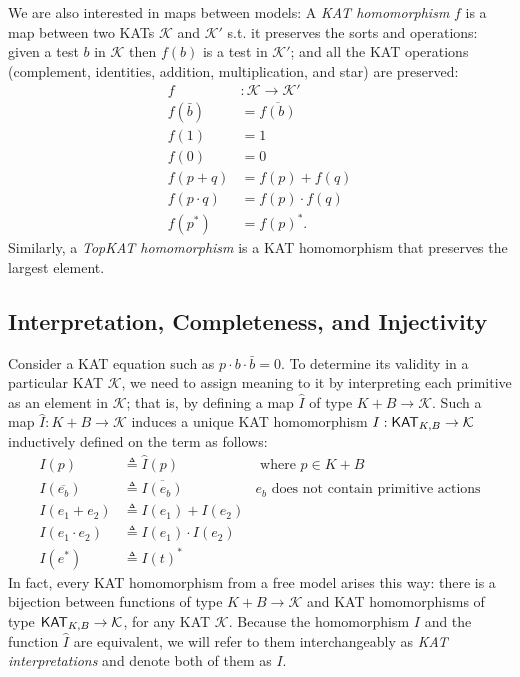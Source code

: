 We are also interested in maps between models:
A \emph{KAT homomorphism} \(f\) is a map between two KATs \(\mathcal{K}\) and \(\mathcal{K}'\)
s.t. it preserves the sorts and operations:
given a test \(b\) in \(\mathcal{K}\) then \(f(b)\) is a test in \(\mathcal{K}'\);
and all the KAT operations (complement, identities, addition, multiplication, and star) are preserved:
\begin{align*}
    f & : \mathcal{K}  \to  \mathcal{K}'\\
    f(\bar{b}) & = \overline{f(b)} \\  
    f(1) & = 1 \\  
    f(0) & = 0 \\
    f(p + q) & = f(p) + f(q) \\  
    f(p  \cdot  q) & = f(p)  \cdot  f(q) \\  
    f(p^*) & = f(p)^*.
\end{align*}
Similarly, a \emph{TopKAT homomorphism} is a KAT homomorphism that preserves the
largest element.

\subsection{Interpretation, Completeness, and Injectivity}\label{sec: completeness background}

Consider a KAT equation such as \(p  \cdot  b  \cdot  \bar{b} = 0\). To determine its
validity in a particular KAT \(\mathcal{K}\), we need to assign meaning to it by
interpreting each primitive as an element in \(\mathcal{K}\); that is, by defining a map
\(\hat{I}\) of type \(K + B  \to  \mathcal{K}\).  Such a map \(\hat{I}: K + B  \to  \mathcal{K}\) induces a
unique KAT homomorphism \(I : \mathsf{KAT}_{K,B}  \to  \mathcal{K}\) inductively defined on the term 
as follows:
\begin{equation}
    \begin{aligned}
        I(p)       &  \triangleq  \hat{I}(p)    & \text{ where } p  \in  K + B \\
        I(\overline{e_b}) &  \triangleq  \overline{I(e_b)} 
            & \text{\(e_b\) does not contain primitive actions} \\
        I(e_1 + e_2) &  \triangleq  I(e_1) + I(e_2)                     \\
        I(e_1  \cdot  e_2) &  \triangleq  I(e_1)  \cdot  I(e_2)                     \\
        I(e^*)     &  \triangleq  I(t)^*
    \end{aligned}
\end{equation}
In fact, every KAT homomorphism from a free model arises this way: there is a
bijection between functions of type \(K + B  \to  \mathcal{K}\) and KAT homomorphisms of type
\(\mathsf{KAT}_{K, B}  \to  \mathcal{K}\), for any KAT \(\mathcal{K}\).  
Because the homomorphism \(I\) and the function \(\hat{I}\) are equivalent, 
we will refer to them interchangeably as \emph{KAT interpretations} 
and denote both of them as \(I\).


